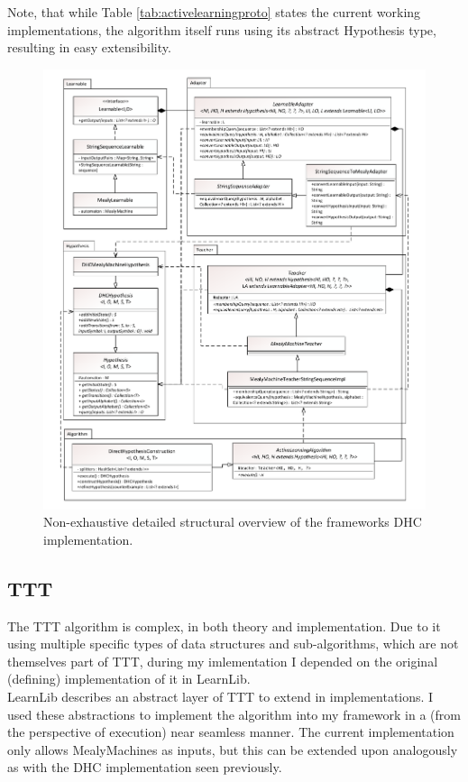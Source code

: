 Note, that while Table \ref{tab:activelearningproto} states the current working implementations, the algorithm itself runs using its abstract Hypothesis type, resulting in easy extensibility.


\begin{figure}
	\centering
	\vspace*{-1.2cm}
	\hspace*{-1.2cm}
	\centerline{\includegraphics[width=\paperwidth,height=\paperheight,keepaspectratio]{figures/implementationdetailedoverview}}
	\caption{Non-exhaustive detailed structural overview of the frameworks DHC implementation.}
	\label{fig:impldetailedoverview}
\end{figure}

\subsection{TTT}

The TTT algorithm is complex, in both theory and implementation. Due to it using multiple specific types of data structures and sub-algorithms, which are not themselves part of TTT, during my imlementation I depended on the original (defining) implementation of it in LearnLib\cite{10.1007/978-3-319-21690-4_32}.
\\
LearnLib describes an abstract layer of TTT to extend in implementations. I used these abstractions to implement the algorithm into my framework in a (from the perspective of execution) near seamless manner. The current implementation only allows MealyMachines as inputs, but this can be extended upon analogously as with the DHC implementation seen previously.

